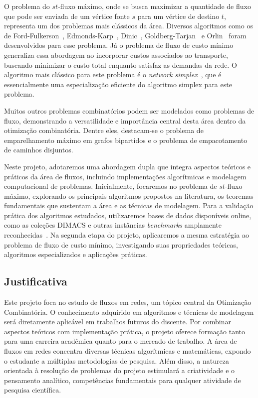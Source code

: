 \documentclass{amsart}
\begin{document}
O problema do \(st\)-fluxo máximo, onde se busca maximizar a quantidade de fluxo que pode ser enviada de um vértice fonte \(s\) para um vértice de destino \(t\), representa um dos problemas mais clássicos da área. Diversos algoritmos como os de Ford-Fulkerson~\cite{ford1956maximal}, Edmonds-Karp~\cite{edmonds1972theoretical}, Dinic~\cite{dinic1970algorithm}, Goldberg-Tarjan~\cite{goldberg1988new} e Orlin~\cite{orlin2013max} foram desenvolvidos para esse problema. Já o problema de fluxo de custo mínimo generaliza essa abordagem ao incorporar custos associados ao transporte, buscando minimizar o custo total enquanto satisfaz as demandas da rede. O algoritmo mais clássico para este problema é o \textit{network simplex}~\cite{dantzig1951application,ahuja1993network}, que é essencialmente uma especialização eficiente do algoritmo simplex para este problema.

Muitos outros problemas combinatórios podem ser modelados como problemas de fluxo, demonstrando a versatilidade e importância central desta área dentro da otimização combinatória. Dentre eles, destacam-se o problema de emparelhamento máximo em grafos bipartidos e o problema de empacotamento de caminhos disjuntos.

Neste projeto, adotaremos uma abordagem dupla que integra aspectos teóricos e práticos da área de fluxos, incluindo implementações algorítmicas e modelagem computacional de problemas. Inicialmente, focaremos no problema de \(st\)-fluxo máximo, explorando os principais algoritmos propostos na literatura, os teoremas fundamentais que sustentam a área e as técnicas de modelagem. Para a validação prática dos algoritmos estudados, utilizaremos bases de dados disponíveis online, como as coleções DIMACS e outras instâncias \textit{benchmarks} amplamente reconhecidas~\cite{Jensen2022}. Na segunda etapa do projeto, aplicaremos a mesma estratégia ao problema de fluxo de custo mínimo, investigando suas propriedades teóricas, algoritmos especializados e aplicações práticas.

\subsection{Justificativa}
Este projeto foca no estudo de fluxos em redes, um tópico central da Otimização Combinatória. O conhecimento adquirido em algoritmos e técnicas de modelagem será diretamente aplicável em trabalhos futuros do discente. Por combinar aspectos teóricos com implementação prática, o projeto oferece formação tanto para uma carreira acadêmica quanto para o mercado de trabalho. A área de fluxos em redes concentra diversas técnicas algorítmicas e matemáticas, expondo o estudante a múltiplas metodologias de pesquisa. Além disso, a natureza orientada à resolução de problemas do projeto estimulará a criatividade e o pensamento analítico, competências fundamentais para qualquer atividade de pesquisa científica.
\end{document}
